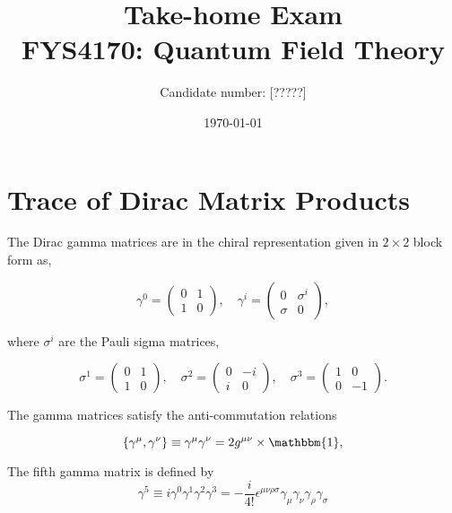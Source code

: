 \documentclass[11pt, a4paper]{amsart}
\title[FYS4170: Take-home Exam]{Take-home Exam \\
   \hrulefill \small{ FYS4170: Quantum Field Theory } \hrulefill}
\author[Candidate numer]{Candidate number: [?????]}
\date{\today}
\begin{document}
 
\maketitle

\section{Trace of Dirac Matrix Products}

The Dirac gamma matrices are in the chiral representation given in $2\times 2$ block form as,

\begin{equation}
\gamma^0 = \begin{pmatrix}
0 & 1 \\ 1 & 0
\end{pmatrix}, \quad
\gamma^i = \begin{pmatrix}
0 & \sigma^i \\ \sigma & 0
\end{pmatrix},
\end{equation}

where $\sigma^i$ are the Pauli sigma matrices,

\begin{equation}
\sigma^1 = \begin{pmatrix}
0 &  1 \\ 1 & 0
\end{pmatrix},
\quad
\sigma^2 = \begin{pmatrix}
0 & -i \\ i & 0
\end{pmatrix},
\quad
\sigma^3 = \begin{pmatrix}
1 & 0 \\ 0 & -1
\end{pmatrix}.
\end{equation}

The gamma matrices satisfy the anti-commutation relations

\begin{equation}
\label{eq:gamma_anti_comm}
\{\gamma^\mu, \gamma^\nu\} \equiv \gamma^\mu \gamma^\nu = 2g^{\mu\nu} \times \mathbbm{1},
\end{equation}

The fifth gamma matrix is defined by
\begin{equation}
\gamma^5 \equiv i \gamma^0 \gamma^1 \gamma^2 \gamma^3 
= -\frac{i}{4!}\epsilon^{\mu\nu\rho\sigma}\gamma_\mu\gamma_\nu\gamma_\rho\gamma_\sigma
\end{equation}
\end{document}
